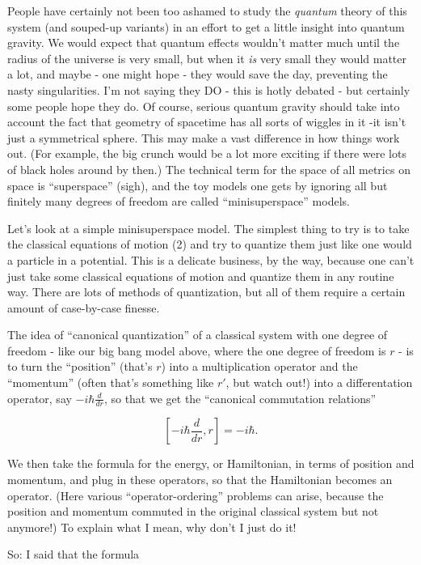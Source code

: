 \documentclass{article}
\begin{document}
People have certainly not been too ashamed to study the \emph{quantum}
theory of this system (and souped-up variants) in an effort to get a
little insight into quantum gravity. We would expect that quantum
effects wouldn't matter much until the radius of the universe is very
small, but when it \emph{is} very small they would matter a lot, and
maybe - one might hope - they would save the day, preventing the nasty
singularities. I'm not saying they DO - this is hotly debated - but
certainly some people hope they do. Of course, serious quantum gravity
should take into account the fact that geometry of spacetime has all
sorts of wiggles in it -it isn't just a symmetrical sphere. This may
make a vast difference in how things work out. (For example, the big
crunch would be a lot more exciting if there were lots of black holes
around by then.) The technical term for the space of all metrics on
space is ``superspace'' (sigh), and the toy models one gets by ignoring
all but finitely many degrees of freedom are called ``minisuperspace''
models.

Let's look at a simple minisuperspace model. The simplest thing to try
is to take the classical equations of motion (2) and try to quantize
them just like one would a particle in a potential. This is a delicate
business, by the way, because one can't just take some classical
equations of motion and quantize them in any routine way. There are lots
of methods of quantization, but all of them require a certain amount of
case-by-case finesse.

The idea of ``canonical quantization'' of a classical system with one
degree of freedom - like our big bang model above, where the one degree
of freedom is \(r\) - is to turn the ``position'' (that's \(r\)) into a
multiplication operator and the ``momentum'' (often that's something
like \(r'\), but watch out!) into a differentation operator, say
\(-i \hbar \frac{d}{dr}\), so that we get the ``canonical commutation
relations''

\[[-i \hbar \frac{d}{dr}, r] = -i \hbar.\]

We then take the formula for the energy, or Hamiltonian, in terms of
position and momentum, and plug in these operators, so that the
Hamiltonian becomes an operator. (Here various ``operator-ordering''
problems can arise, because the position and momentum commuted in the
original classical system but not anymore!) To explain what I mean, why
don't I just do it!

So: I said that the formula
\end{document}
